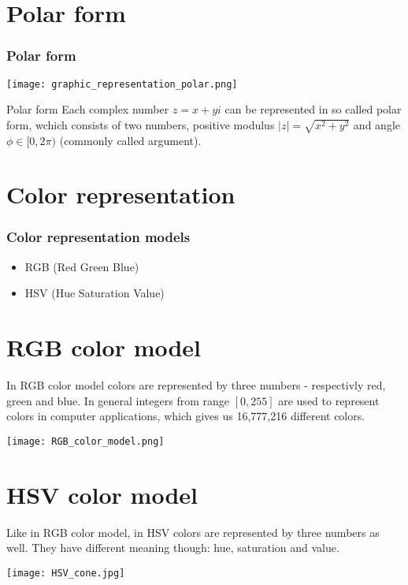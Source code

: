 \documentclass[11pt]{beamer}
\begin{document}
\section{Polar form}
\begin{frame}
\frametitle{Polar form}
\begin{center}
\texttt{[image: graphic\_representation\_polar.png]}
\end{center}
\pause
\begin{block}{Polar form}
Each complex number $z=x+yi$ can be represented in so called polar form, wchich consists of two numbers, positive modulus $|z|=\sqrt{x^2+y^2}$ and angle $\phi\in[0,2\pi)$ (commonly called argument).
\end{block}
\end{frame}
\section{Color representation}
\frametitle{Color representation models}
\begin{frame}
\begin{itemize}
\item RGB \pause(Red Green Blue)\pause
\item HSV \pause(Hue Saturation Value)
\end{itemize}
\end{frame}
\section{RGB color model}
\begin{frame}
In RGB color model colors are represented by three numbers - respectivly red, green and blue.
In general integers from range $[0,255]$ are used to represent colors in computer applications, which gives us 16,777,216 different colors.
\begin{center}
\texttt{[image: RGB\_color\_model.png]}
\end{center}
\end{frame}
\section{HSV color model}
\begin{frame}
Like in RGB color model, in HSV colors are represented by three numbers as well. They have different meaning though: hue, saturation and value.\pause
\begin{center}
\texttt{[image: HSV\_cone.jpg]}
\end{center}
\end{frame}
\end{document}
